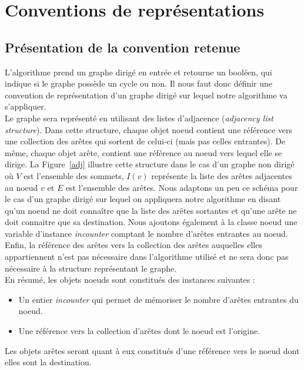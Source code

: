 \section{Conventions de représentations}

\subsection{Présentation de la convention retenue}
L'algorithme prend un graphe dirigé en entrée et retourne un booléen, qui indique si le graphe possède un cycle ou non. Il nous faut donc définir une convention de représentation d'un graphe dirigé sur lequel notre algorithme va s'appliquer. \\

Le graphe sera représenté en utilisant des listes d'adjacence (\textit{adjacency list structure}). Dans cette structure, chaque objet noeud contient une référence vers une collection des arêtes qui sortent de celui-ci (mais pas celles entrantes). De même, chaque objet arête, contient une référence au noeud vers lequel elle se dirige. 
La Figure~\ref{adj} illustre cette structure dans le cas d'un graphe non dirigé où $V$ est l'ensemble des sommets, $I(v)$ représente la liste des arêtes adjacentes au noeud $v$ et $E$ est l'ensemble des arêtes. Nous adaptons un peu ce schéma pour le cas d'un graphe dirigé sur lequel on appliquera notre algorithme en disant qu'un noeud ne doit connaître que la liste des arêtes sortantes et qu'une arête ne doit connaitre que sa destination. Nous ajoutons également à la classe noeud une variable d'instance \textit{incounter} comptant le nombre d'arêtes entrantes au noeud. Enfin, la référence des arêtes vers la collection des arêtes auquelles elles appartiennent n'est pas nécessaire dans l'algorithme utilisé et ne sera donc pas nécessaire à la structure représentant le graphe. \\

En résumé, les objets noeuds sont constitués des instances suivantes : 
\begin{itemize}
\item Un entier \textit{incounter} qui permet de mémoriser le nombre d'arêtes entrantes du noeud.
\item Une référence vers la collection d'arêtes dont le noeud est l'origine.\\
\end{itemize}

Les objets arêtes seront quant à eux constitués d'une référence vers le noeud dont elles sont la destination.\\


